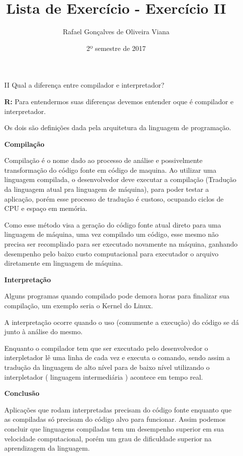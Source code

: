 \documentclass[12pt]{article}
\title{Lista de Exercício  - Exercício II }
\author{Rafael Gonçalves de  Oliveira Viana}
\date{2º semestre de 2017}
\begin{document}
\maketitle

\begin{enumerate}
\item[II]
Qual a diferença entre compilador e interpretador?

\textbf{R:}	
Para entendermos suas diferenças devemos entender oque é compilador e interpretador.
 
Os dois são definições dada pela arquitetura da linguagem de programação.

\textbf{Compilação}

Compilação é o nome dado ao processo de análise e possivelmente transformação do código fonte em código de maquina. Ao utilizar uma linguagem compilada, o desenvolvedor deve executar a compilação (Tradução da linguagem atual pra linguagem de máquina), para poder testar a aplicação, porém esse processo de tradução é custoso, ocupando ciclos de CPU e espaço em memória.

Como esse método visa a geração do código fonte atual direto para uma linguagem de máquina, uma vez compilado um código, esse mesmo não precisa ser recompliado para ser executado novamente na máquina, ganhando desempenho pelo baixo custo computacional para executador o arquivo diretamente em linguagem de máquina.

\textbf{Interpretação}

Alguns programas quando compilado pode demora horas para finalizar sua compilação, um exemplo seria o Kernel do Linux. 

A interpretação ocorre quando o uso (comumente a execução) do código se dá junto à análise do mesmo.

Enquanto o compilador tem que ser executado pelo desenvolvedor o interpletador lê uma linha de cada vez e executa o comando, sendo assim a tradução da linguagem de alto nível para de baixo nível utilizando o interpletador ( linguagem intermediária ) acontece em tempo real.

\textbf{Conclusão}

 Aplicações que rodam interpretadas precisam do código fonte enquanto que as compiladas só precisam do código alvo para funcionar. Assim podemos concluir que linguagens compiladas tem um desempenho superior em sua velocidade computacional, porém um grau de dificuldade superior na aprendizagem da linguagem.

 
 
\end{enumerate}
\end{document}
